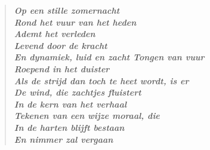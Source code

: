 






\newpage
\tableofcontents

\newpage
{}
\begin{verse}
\it{\bf{O}p een stille zomernacht\\
    \bf{R}ond het vuur van het heden\\
    \bf{A}demt het verleden\\
    \bf{L}evend door de kracht\\
    \bf{E}n dynamiek, luid en zacht
\vl
    \bf{T}ongen van vuur\\
    \bf{R}oepend in het duister\\
    \bf{A}ls de strijd dan toch te heet wordt, is er\\
    \bf{D}e wind, die zachtjes fluistert\\
    \bf{I}n de kern van het verhaal\\
    \bf{T}ekenen van een wijze moraal, die\\
    \bf{I}n de harten blijft bestaan\\
    \bf{E}n nimmer zal vergaan}
\end{verse}

